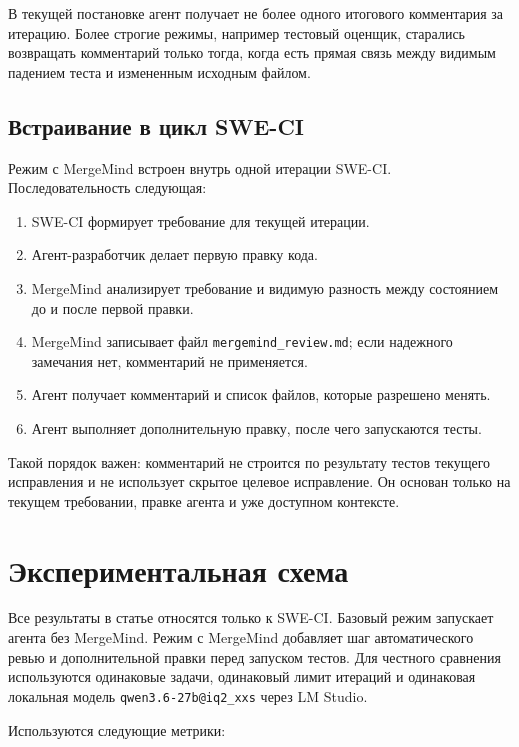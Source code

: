 \documentclass[12pt,a4paper]{article}
\begin{document}
В текущей постановке агент получает не более одного итогового комментария за
итерацию. Более строгие режимы, например тестовый оценщик, старались возвращать
комментарий только тогда, когда есть прямая связь между видимым падением теста
и измененным исходным файлом.

\subsection{Встраивание в цикл SWE-CI}

Режим с MergeMind встроен внутрь одной итерации SWE-CI. Последовательность
следующая:

\begin{enumerate}
  \item SWE-CI формирует требование для текущей итерации.
  \item Агент-разработчик делает первую правку кода.
  \item MergeMind анализирует требование и видимую разность между состоянием
    до и после первой правки.
  \item MergeMind записывает файл \texttt{mergemind\_review.md}; если надежного
    замечания нет, комментарий не применяется.
  \item Агент получает комментарий и список файлов, которые разрешено менять.
  \item Агент выполняет дополнительную правку, после чего запускаются тесты.
\end{enumerate}

Такой порядок важен: комментарий не строится по результату тестов текущего
исправления и не использует скрытое целевое исправление. Он основан только
на текущем требовании, правке агента и уже доступном контексте.

\section{Экспериментальная схема}

Все результаты в статье относятся только к SWE-CI. Базовый режим запускает
агента без MergeMind. Режим с MergeMind добавляет шаг автоматического ревью и
дополнительной правки перед запуском тестов. Для честного сравнения используются одинаковые
задачи, одинаковый лимит итераций и одинаковая локальная модель
\texttt{qwen3.6-27b@iq2\_xxs} через LM Studio.

Используются следующие метрики:
\end{document}
